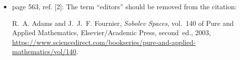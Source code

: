 \documentclass[mytheorems]{SIAMbook2019}
\newcommand{\erratafix}[1]{\medskip\newline\colorbox{latexgray}{\begin{minipage}[t]{0.90\textwidth}#1\end{minipage}}}
\begin{document}
\begin{itemize}[itemsep=10pt]
\item \textcolor{tab-red}{page 563, ref. [2]:} The term ``editors'' should be removed from the citation:
    \erratafix{
      {\sc R.~A. Adams and J.~J.~F. Fournier}, {\em Sobolev Spaces}, vol.~140 of Pure and Applied Mathematics, Elsevier/Academic Press, second~ed., 2003, \url{https://www.sciencedirect.com/bookseries/pure-and-applied-mathematics/vol/140}.
    }

\end{itemize}
\end{document}
